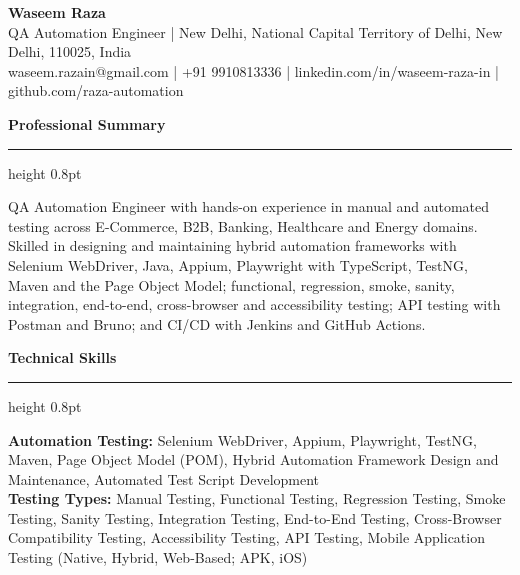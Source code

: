 \documentclass[10pt,a4paper]{article}
\newcommand{\sectionheader}[1]{%
    \vspace{4pt}
    {\normalsize\bfseries #1}
    \vspace{1pt}
    \hrule height 0.8pt
    \vspace{3pt}
}
\begin{document}

\begin{center}
    {\LARGE\bfseries Waseem Raza}\\[3pt]
    QA Automation Engineer | New Delhi, National Capital Territory of Delhi, New Delhi, 110025, India\\
    waseem.razain@gmail.com | +91 9910813336 | linkedin.com/in/waseem-raza-in | github.com/raza-automation
\end{center}

\vspace{1pt}


\sectionheader{Professional Summary}

QA Automation Engineer with hands-on experience in manual and automated testing across E-Commerce, B2B, Banking, Healthcare and Energy domains. Skilled in designing and maintaining hybrid automation frameworks with Selenium WebDriver, Java, Appium, Playwright with TypeScript, TestNG, Maven and the Page Object Model; functional, regression, smoke, sanity, integration, end-to-end, cross-browser and accessibility testing; API testing with Postman and Bruno; and CI/CD with Jenkins and GitHub Actions.


\sectionheader{Technical Skills}

\textbf{Automation Testing:} Selenium WebDriver, Appium, Playwright, TestNG, Maven, Page Object Model (POM), Hybrid Automation Framework Design and Maintenance, Automated Test Script Development\\[1pt]

\textbf{Testing Types:} Manual Testing, Functional Testing, Regression Testing, Smoke Testing, Sanity Testing, Integration Testing, End-to-End Testing, Cross-Browser Compatibility Testing, Accessibility Testing, API Testing, Mobile Application Testing (Native, Hybrid, Web-Based; APK, iOS)\\[1pt]
\end{document}
